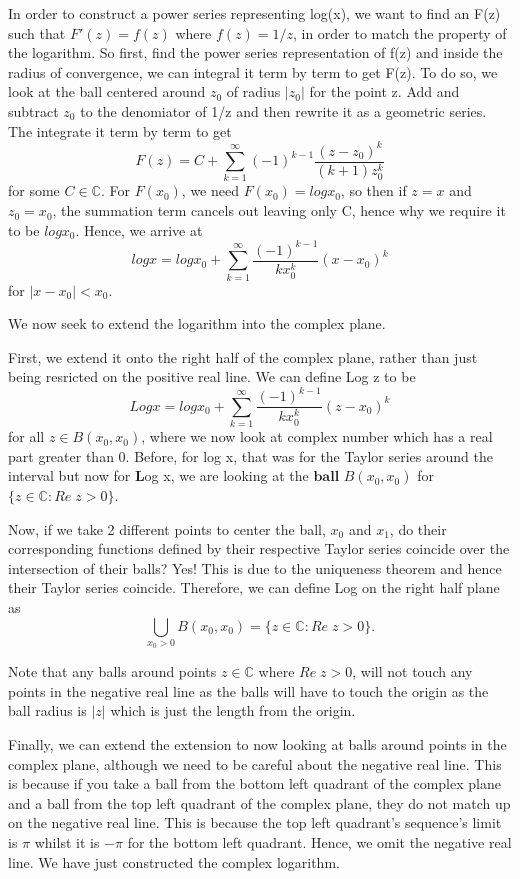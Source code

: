 \documentclass[twoside]{article}
\begin{document}
In order to construct a power series representing log(x), we want to find an F(z) such that $F'(z) = f(z)$ where $f(z) = 1/z$, in order to match the property of the logarithm. So first, find the power series representation of f(z) and inside the radius of convergence, we can integral it term by term to get F(z). To do so, we look at the ball centered around $z_0$ of radius $|z_0|$ for the point z. Add and subtract $z_0$ to the denomiator of 1/z and then rewrite it as a geometric series. The integrate it term by term to get
$$
F(z) = C + \sum_{k=1}^{\infty}(-1)^{k-1}\frac{(z-z_0)^{k}}{(k+1)z_0^{k}}
$$
for some $C \in \mathbb{C}$. For $F(x_0)$, we need $F(x_0) = log x_0$, so then if $z = x$ and $z_0 = x_0$, the summation term cancels out leaving only C, hence why we require it to be $log x_0$. Hence, we arrive at
$$
log x = log x_0 + \sum_{k=1}^{\infty}\frac{(-1)^{k-1}}{kx_0^k}(x - x_0)^k
$$
for $|x - x_0| < x_0$.

\bigskip
We now seek to extend the logarithm into the complex plane. 

First, we extend it onto the right half of the complex plane, rather than just being resricted on the positive real line. We can define Log z to be
$$
Log x = log x_0 + \sum_{k=1}^{\infty}\frac{(-1)^{k-1}}{kx_0^k}(z - x_0)^k
$$
for all $z \in B(x_0,x_0)$, where we now look at complex number which has a real part greater than 0. Before, for log x, that was for the Taylor series around the interval but now for $\textbf{L}$og x, we are looking at the $\textbf{ball}$ $B(x_0,x_0)$ for $\{z \in \mathbb{C}: Re \; z > 0\}$. 

Now, if we take 2 different points to center the ball, $x_0$ and $x_1$, do their corresponding functions defined by their respective Taylor series coincide over the intersection of their balls? Yes! This is due to the uniqueness theorem and hence their Taylor series coincide. Therefore, we can define Log on the right half plane as
$$
\bigcup_{x_0 > 0}B(x_0,x_0) = \{z \in \mathbb{C}: Re \;z > 0\}.
$$

\bigskip

Note that any balls around points $z \in \mathbb{C}$ where $Re \; z > 0$, will not touch any points in the negative real line as the balls will have to touch the origin as the ball radius is $|z|$ which is just the length from the origin.

Finally, we can extend the extension to now looking at balls around points in the complex plane, although we need to be careful about the negative real line. This is because if you take a ball from the bottom left quadrant of the complex plane and a ball from the top left quadrant of the complex plane, they do not match up on the negative real line. This is because the top left quadrant's sequence's limit is $\pi$ whilst it is $-\pi$ for the bottom left quadrant. Hence, we omit the negative real line. We have just constructed the complex logarithm. 
\end{document}
